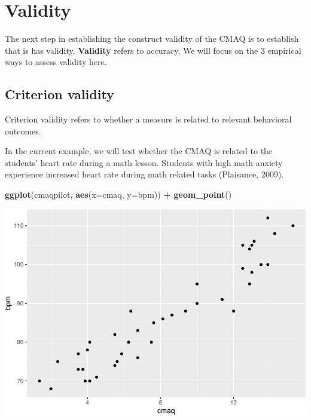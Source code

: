 \documentclass[
]{book}
\newenvironment{Shaded}{\begin{snugshade}}{\end{snugshade}}
\newcommand{\DataTypeTok}[1]{\textcolor[rgb]{0.13,0.29,0.53}{#1}}
\newcommand{\KeywordTok}[1]{\textcolor[rgb]{0.13,0.29,0.53}{\textbf{#1}}}
\newcommand{\NormalTok}[1]{#1}
\newcommand{\OperatorTok}[1]{\textcolor[rgb]{0.81,0.36,0.00}{\textbf{#1}}}
\newcommand{\StringTok}[1]{\textcolor[rgb]{0.31,0.60,0.02}{#1}}
\begin{document}
\hypertarget{validity}{%
\section{Validity}\label{validity}}

The next step in establishing the construct validity of the CMAQ is to establish that is has validity. \textbf{Validity} refers to accuracy. We will focus on the 3 empirical ways to assess validity here.

\hypertarget{criterion-validity}{%
\subsection{Criterion validity}\label{criterion-validity}}

Criterion validity refers to whether a measure is related to relevant behavioral outcomes.

In the current example, we will test whether the CMAQ is related to the students' heart rate during a math lesson. Students with high math anxiety experience increased
heart rate during math related tasks (Plaisance, 2009).

\begin{Shaded}
\begin{Highlighting}[]
\KeywordTok{ggplot}\NormalTok{(cmaqpilot, }\KeywordTok{aes}\NormalTok{(}\DataTypeTok{x=}\NormalTok{cmaq, }\DataTypeTok{y=}\NormalTok{bpm)) }\OperatorTok{+}
\StringTok{  }\KeywordTok{geom_point}\NormalTok{() }
\end{Highlighting}
\end{Shaded}

\includegraphics{Tools-for-working-with-data-211_files/figure-latex/unnamed-chunk-23-1.pdf}
\end{document}
